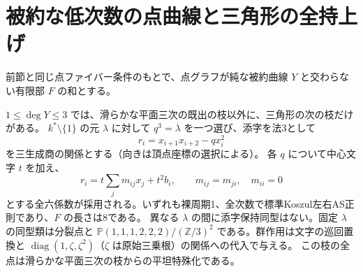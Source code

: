 \section{被約な低次数の点曲線と三角形の全持上げ}
\label{sec:reduced-cubic-point-curves}
前節と同じ点ファイバー条件のもとで、点グラフが純な被約曲線 $Y$ と交わらない有限部 $F$ の和とする。

\begin{theorem}\label{thm:reduced-cubic-point-curves}
$1\le\deg Y\le3$ では、滑らかな平面三次の既出の枝以外に、三角形の次の枝だけがある。
$k^*\setminus\{1\}$ の元 $\lambda$ に対して $q^3=\lambda$ を一つ選び、添字を法3として
\[
              r_i=x_{i+1}x_{i+2}-q x_i^2
\]
を三生成商の関係とする（向きは頂点座標の選択による）。
各 $q$ について中心文字 $t$ を加え、
\[
       r_i=t\sum_j m_{ij}x_j+t^2 b_i,\qquad m_{ij}=m_{ji},\quad m_{ii}=0
\]
とする全六係数が採用される。いずれも裸周期1、全次数で標準Koszul左右AS正則であり、$F$ の長さは8である。
異なる $\lambda$ の間に添字保持同型はない。固定 $\lambda$ の同型類は分裂点と
$\mathbb P(1,1,1,2,2,2)/(\mathbb Z/3)^2$ である。群作用は文字の巡回置換と
$\operatorname{diag}(1,\zeta,\zeta^2)$（$\zeta$ は原始三乗根）の関係への代入で与える。
この枝の全点は滑らかな平面三次の枝からの平坦特殊化である。
\end{theorem}
